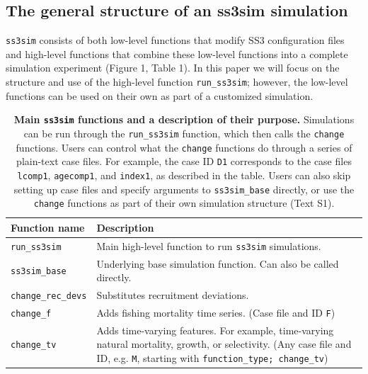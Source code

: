 \documentclass[12pt]{article}
\begin{document}
\subsection*{The general structure of an ss3sim simulation}

\texttt{ss3sim} consists of both low-level functions that modify SS3 configuration files and high-level functions that combine these low-level functions into a complete simulation experiment (Figure 1, Table 1). In this paper we will focus on the structure and use of the high-level function \texttt{run\_ss3sim}; however, the low-level functions can be used on their own as part of a customized simulation.

\begin{table}[htpb]
  \centering
\caption{\textbf{Main \texttt{ss3sim} functions and a description of their purpose.} Simulations can be run through the \texttt{run\_ss3sim} function, which then calls the \texttt{change} functions. Users can control what the \texttt{change} functions do through a series of plain-text case files. For example, the case ID \texttt{D1} corresponds to the case files \texttt{lcomp1}, \texttt{agecomp1}, and \texttt{index1}, as described in the table. Users can also skip setting up case files and specify arguments to \texttt{ss3sim\_base} directly, or use the \texttt{change} functions as part of their own simulation structure (Text S1).}
  \begin{tabular}{p{4.5cm}p{10cm}}
    \toprule
Function name &          Description\\
    \midrule
    \texttt{run\_ss3sim} &           Main high-level function to run \texttt{ss3sim} simulations.\\

    \texttt{ss3sim\_base} &          Underlying base simulation function. Can also be called directly.\\

    \texttt{change\_rec\_devs} &      Substitutes recruitment deviations.\\

    \texttt{change\_f} &             Adds fishing mortality time series. (Case file and ID \texttt{F})\\

    \texttt{change\_tv} &            Adds time-varying features. For example, time-varying natural mortality, growth, or selectivity. (Any case file and ID, e.g. \texttt{M}, starting with \texttt{function\_type; change\_tv})\\


\end{tabular}
\end{table}
\end{document}
